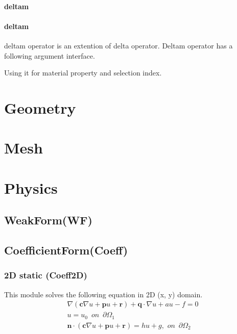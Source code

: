 \documentclass[11pt,a4paper,final]{report}
\begin{document}
\subsubsection{deltam}
\subsubsection{deltam}
deltam operator is an extention of delta operator. Deltam operator has a following argument interface.


Using it for material property and selection index.
\chapter{Geometry}

\chapter{Mesh}

\chapter{Physics}
\section{WeakForm(WF)}
\section{CoefficientForm(Coeff)}
\subsection{2D static (Coeff2D)}
This module solves the following equation in 2D (x, y) domain.
  \begin{align}
   \nabla (\mathbf{c} \nabla u + \mathbf{p}u + \mathbf{r}) + \mathbf{q} \cdot \nabla u + au - f = 0 
  \\  
  u = u_{0} \,\,\,on\,\,\,\partial \Omega_{1}
  \\
 \mathbf{n}\cdot (\mathbf{c} \nabla u + \mathbf{p}u + \mathbf{r}) = hu + g,\,\,on\,\,\,\partial \Omega_{2}
  \end{align}
  
 

 
\end{document}
